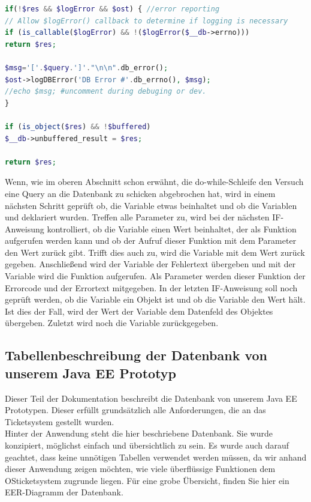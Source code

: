 \begin{lstlisting}[language=PHP, caption=mysqli.php/function-db\_query3, firstnumber=173]
if(!$res && $logError && $ost) { //error reporting
// Allow $logError() callback to determine if logging is necessary
if (is_callable($logError) && !($logError($__db->errno)))
return $res;

$msg='['.$query.']'."\n\n".db_error();
$ost->logDBError('DB Error #'.db_errno(), $msg);
//echo $msg; #uncomment during debuging or dev.
}

if (is_object($res) && !$buffered)
$__db->unbuffered_result = $res;

return $res;
\end{lstlisting}
\vspace{-.5cm}
Wenn, wie im oberen Abschnitt schon erwähnt, die do-while-Schleife den Versuch eine Query an die Datenbank zu schicken abgebrochen hat, wird in einem nächsten Schritt geprüft ob, die Variable  etwas beinhaltet und ob die Variablen  und  deklariert wurden. Treffen alle Parameter zu, wird bei der nächsten IF-Anweisung kontrolliert, ob die Variable  einen Wert beinhaltet, der als Funktion aufgerufen werden kann und ob der Aufruf dieser Funktion mit dem Parameter  den Wert  zurück gibt.
Trifft dies auch zu, wird die Variable  mit dem Wert  zurück gegeben. Anschließend wird der Variable  der Fehlertext übergeben und mit der Variable   wird die Funktion  aufgerufen. Als Parameter werden dieser Funktion der Errorcode und der Errortext mitgegeben.
In der letzten IF-Anweisung soll noch geprüft werden, ob die Variable  ein Objekt ist und ob die Variable  den Wert  hält. Ist dies der Fall, wird der Wert der Variable  dem Datenfeld  des Objektes  übergeben. 
Zuletzt wird noch die Variable  zurückgegeben.
\newpage
\subsection{Tabellenbeschreibung der Datenbank von unserem Java EE Prototyp}
Dieser Teil der Dokumentation beschreibt die Datenbank von unserem Java EE Prototypen. Dieser erfüllt grundsätzlich alle Anforderungen, die an das Ticketsystem gestellt wurden.\\
Hinter der Anwendung steht die hier beschriebene Datenbank. Sie wurde konzipiert, möglichst einfach und übersichtlich zu sein. Es wurde auch darauf geachtet, dass keine unnötigen Tabellen verwendet werden müssen, da wir anhand dieser Anwendung zeigen möchten, wie viele überflüssige Funktionen dem OSticketsystem zugrunde liegen.
Für eine grobe Übersicht, finden Sie hier ein EER-Diagramm der Datenbank.

